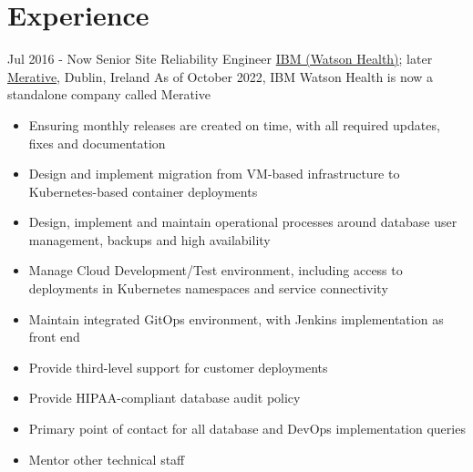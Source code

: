 \documentclass[letterpaper]{tenseconds} %
\begin{document}
\section{Experience}
\begin{twenty} %
	\twentyitem
	{Jul 2016 -}
	{Now}
	{Senior Site Reliability Engineer}
	{\href{https://www.ibm.com/watson-health}{IBM (Watson Health)}; later \href{https://merative.com}{Merative}, Dublin, Ireland}
	{As of October 2022, IBM Watson Health is now a standalone company called Merative }
	{
		\begin{itemize}
			\item Ensuring monthly releases are created on time, with all required updates, fixes and documentation
			\item Design and implement migration from VM-based infrastructure to Kubernetes-based container deployments
			\item Design, implement and maintain operational processes around database user management, backups and high availability
			\item Manage Cloud Development/Test environment, including access to deployments in Kubernetes namespaces and service connectivity
			\item Maintain integrated GitOps environment, with Jenkins implementation as front end
			\item Provide third-level support for customer deployments
			\item Provide HIPAA-compliant database audit policy
			\item Primary point of contact for all database and DevOps implementation queries
			\item Mentor other technical staff
		\end{itemize}
}
\end{twenty}
\end{document}
